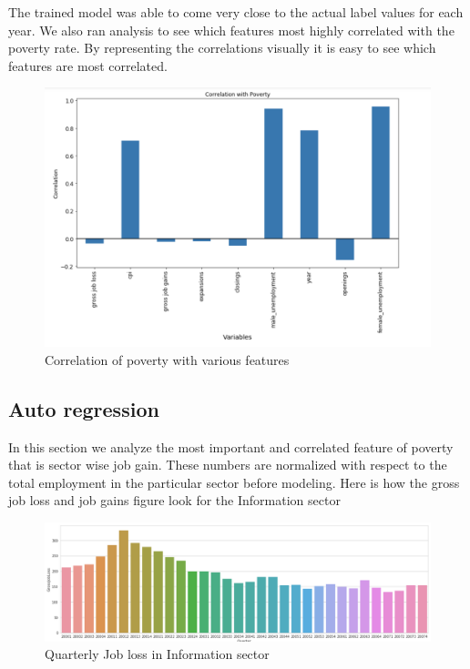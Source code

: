 \documentclass[11pt,letterpaper]{article}
\begin{document}
The trained model was able to come very close to the actual label values for each year. We also ran analysis to see which features most highly correlated with the poverty rate. By representing the correlations visually it is easy to see which features are most correlated. 

\begin{figure}[h]
	\includegraphics[width=\linewidth]{"./pictures/Correlation_With_Poverty"}
	\caption{Correlation of poverty with various features}
    \label{fig:Feature Correlation}
\end{figure}

\subsection{Auto regression}
\label{ssec:autoregResult}

In this section we analyze the most important and correlated feature of poverty that is sector wise job gain. These numbers are normalized with respect to the total employment in the particular sector before modeling. Here is how the gross job loss and job gains figure look for the Information sector

\begin{figure}[h]
	\includegraphics[width=\linewidth]{"./pictures/jobloss"}
	\caption{Quarterly Job loss in Information sector}
    \label{fig:Job loss figures in Information sector}
\end{figure}
\end{document}
